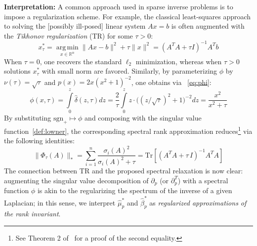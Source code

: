 \documentclass[10pt]{article}
\numberwithin{equation}{section}
\newcommand{\+}{%
	\raisebox{0.18ex}{\scaleobj{0.55}{+}}
}
\DeclareMathOperator*{\argmin}{arg\,min}
\theoremstyle{definition}
\theoremstyle{definition}
\begin{document}
\noindent \textbf{Interpretation:} A common approach used in sparse inverse problems is to impose a regularization scheme. 
For example, the classical least-squares approach to solving the [possibly ill-posed] linear system $A x = b$ is often augmented with the \emph{Tikhonov regularization} (TR) for some $\tau > 0$:
 \begin{equation}\label{eq:tikhonov}
	x_\tau^\ast = \argmin\limits_{x \in \mathbb{R}^n} \lVert Ax - b\rVert^2 + \tau \lVert x \rVert^2 = (A^T A + \tau I)^{-1} A^T b
\end{equation}
When $\tau = 0$, one recovers the standard $\ell_2$ minimization, whereas when $\tau > 0$ solutions $x_\tau^\ast$ with small norm are favored. 
Similarly, by parameterizing
$\phi$ by $\nu(\tau) = \sqrt{\tau}$ and $p(x) = 2x (x^2 + 1)^{-2}$, one obtains via ~\eqref{eq:phi}:
\begin{equation}
	\phi(x, \tau) = \int\limits_{0}^z \hat{\delta}(z, \tau) dz = \frac{2}{\tau}\int\limits_{0}^z z \cdot  \big((z/\sqrt{\tau})^2+1\big)^{-2} dz = \frac{x^2}{x^2 + \tau} %
\end{equation}
By substituting $\mathrm{sgn}_+ \mapsto \phi$ and composing with the singular value function~\eqref{def:lowner}, the corresponding spectral rank approximation reduces\footnote{See Theorem 2 of~\cite{zhao2012approximation} for a proof of the second equality.} via the following identities:
\begin{equation}\label{eq:tikhonov_1}
	\lVert \Phi_\tau(A) \rVert_\ast = \sum\limits_{i = 1}^n \frac{\sigma_i(A)^2}{\sigma_i(A)^2 + \tau} = \mathrm{Tr}\left[(A^T A + \tau \, I)^{-1} A^T A \right]
\end{equation}
The connection between TR and the proposed spectral relaxation is now clear: augmenting the singular value decomposition of $\partial_p$ (or $\partial_p^T$) with a spectral function $\phi$ is akin to the regularizing the spectrum of the inverse of a given Laplacian; 
in this sense, we interpret $\hat{\mu}_p^\ast$ and $\hat{\beta}_p^\ast$ as \emph{regularized approximations of the rank invariant}.
\end{document}
